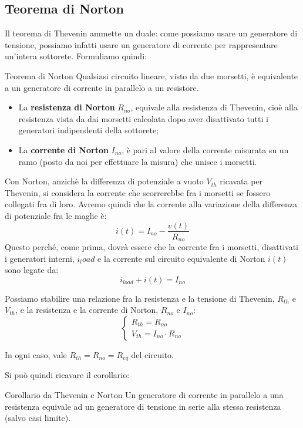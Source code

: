 \documentclass[a4paper,11pt]{article}
\begin{document}
\subsection{Teorema di Norton}
Il teorema di Thevenin ammette un duale: come possiamo usare un generatore di tensione, possiamo infatti usare un generatore di corrente per rappresentare un'intera sottorete.
Formuliamo quindi:
\begin{theorem}{Teorema di Norton}
	Qualsiasi circuito lineare, visto da due morsetti, è equivalente a un generatore di corrente in parallelo a un resistore.

\begin{itemize}
	\item La \textbf{resistenza di Norton} $R_{no}$, equivale alla resistenza di Thevenin, cioè alla resistenza vista da dai morsetti calcolata dopo aver disattivato tutti i generatori indipendenti della sottorete;
	\item La \textbf{corrente di Norton} $I_{no}$, è pari al valore della corrente misurata su un ramo (posto da noi per effettuare la misura) che unisce i morsetti.\end{itemize}
\end{theorem}

Con Norton, anzichè la differenza di potenziale a vuoto $V_{th}$ ricavata per Thevenin, si considera la corrente che scorrerebbe fra i morsetti se fossero collegati fra di loro.
Avremo quindi che la corrente alla variazione della differenza di potenziale fra le maglie è:
$$
i(t) = I_{no} - \frac{v(t)}{R_{no}}
$$
Questo perché, come prima, dovrà essere che la corrente fra i morsetti, disattivati i generatori interni, $i_load$ e la corrente sul circuito equivalente di Norton $i(t)$ sono legate da:
$$
i_{load} + i(t) = I_{no}
$$

\par\medskip 

Possiamo stabilire una relazione fra la resistenza e la tensione di Thevenin, $R_{th}$ e $V_{th}$, e la resistenza e la corrente di Norton, $R_{no}$ e $I_{no}$:
\[
	\begin{cases}
		R_{th} = R_{no} \\ 
		V_{th} = I_{no} \cdot R_{no}
	\end{cases}
\]

In ogni caso, vale $R_{th} = R_{no} = R_{eq}$ del circuito.

Si può quindi ricavare il corollario:
\begin{theorem}{Corollario da Thevenin e Norton}
	Un generatore di corrente in parallelo a una resistenza equivale ad un generatore di tensione in serie alla stessa resistenza (salvo casi limite).
\end{theorem}
\end{document}

